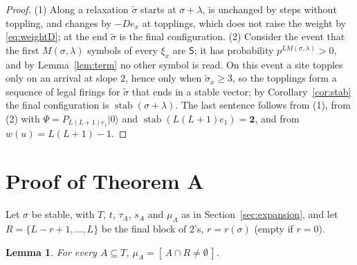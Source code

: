 \documentclass[11pt]{amsart}
\newtheorem{lemma}[theorem]{Lemma}
\theoremstyle{definition}
\theoremstyle{remark}
\newcommand{\stab}{\operatorname{stab}}
\newcommand{\ket}[1]{|#1\rangle}
\newcommand{\two}{\mathbf{2}}
\newcommand{\Ind}[1]{[\,#1\,]}
\begin{document}
\begin{proof}
(1) Along a relaxation $\tilde\sigma$ starts at $\sigma+\lambda$, is unchanged by steps without toppling, and changes by $-De_x$ at topplings, which does not raise the weight by \eqref{eq:weightD}; at the end $\tilde\sigma$ is the final configuration. (2) Consider the event that the first $M(\sigma,\lambda)$ symbols of every $\xi_x$ are $\mathsf S$; it has probability $p^{LM(\sigma,\lambda)}>0$, and by Lemma~\ref{lem:term} no other symbol is read. On this event a site topples only on an arrival at slope $2$, hence only when $\tilde\sigma_x\ge3$, so the topplings form a sequence of legal firings for $\tilde\sigma$ that ends in a stable vector; by Corollary~\ref{cor:stab} the final configuration is $\stab(\sigma+\lambda)$. The last sentence follows from (1), from (2) with $\Psi=P_{L(L+1)e_1}\ket0$ and $\stab(L(L+1)e_1)=\two$, and from $w(u)=L(L+1)-1$.
\end{proof}

\section{Proof of Theorem A}\label{sec:proofA}

Let $\sigma$ be stable, with $T$, $t$, $\tau_A$, $s_A$ and $\mu_A$ as in Section~\ref{sec:expansion}, and let $R=\{L-r+1,\dots,L\}$ be the final block of $2$'s, $r=r(\sigma)$ (empty if $r=0$).

\begin{lemma}\label{lem:mu}
For every $A\subseteq T$, $\mu_A=\Ind{A\cap R\ne\emptyset}$.
\end{lemma}
\end{document}
